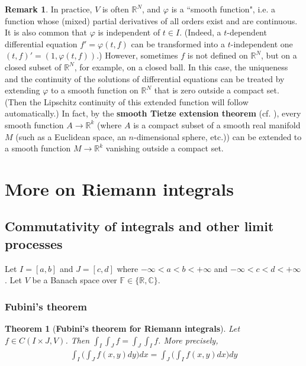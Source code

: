 \documentclass[12pt,b5paper,notitlepage]{article}
\theoremstyle{definition}
\newtheorem{rem}[df]{Remark}
\theoremstyle{plain}
\newtheorem{thm}[df]{Theorem}
\newcommand{\Cbb}{\mathbb C}
\newcommand{\Rbb}{\mathbb R}
\newcommand{\Fbb}{\mathbb F}
\numberwithin{equation}{section}
\begin{document}
\begin{rem}
In practice, $V$ is often $\Rbb^N$, and $\varphi$ is a ``smooth function", i.e. a function whose (mixed) partial derivatives of all orders exist and are continuous. It is also common that $\varphi$ is independent of $t\in I$. (Indeed, a $t$-dependent differential equation $f'=\varphi(t,f)$ can be transformed into a $t$-independent one $(t,f)'=(1,\varphi(t,f))$.) However, sometimes $f$ is not defined on $\Rbb^N$, but on a closed subset of $\Rbb^N$, for example, on a closed ball. In this case, the uniqueness and the continuity of the solutions of differential equations can be treated by extending $\varphi$ to a smooth function on $\Rbb^N$ that is zero outside a compact set. (Then the Lipschitz continuity of this extended function will follow automatically.) In fact, by the \textbf{smooth Tietze extension theorem} (cf. \cite[Lem. 2.26]{Lee}), every smooth function $A\rightarrow\Rbb^k$ (where $A$ is a compact subset of a smooth real manifold $M$ (such as a Euclidean space, an $n$-dimensional sphere, etc.)) can be extended to a smooth function $M\rightarrow\Rbb^k$ vanishing outside a compact set. 
\end{rem}
















\newpage




\section{More on Riemann integrals}


\subsection{Commutativity of integrals and other limit processes}


Let $I=[a,b]$ and $J=[c,d]$ where $-\infty<a<b<+\infty$ and $-\infty<c<d<+\infty$. Let $V$ be a Banach space over $\Fbb\in\{\Rbb,\Cbb\}$.


\subsubsection{Fubini's theorem}


\begin{thm}[\textbf{Fubini's theorem for Riemann integrals}] \label{lb399} 
Let $f\in C(I\times J,V)$. Then $\int_I\int_Jf=\int_J\int_If$. More precisely,
\begin{align}
\int_I\Big(\int_Jf(x,y)dy\Big)dx=\int_J\Big(\int_I f(x,y)dx\Big)dy
\end{align}
\end{thm}
\end{document}
